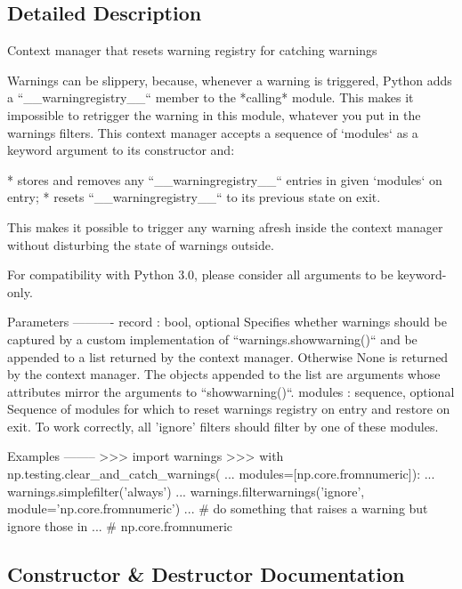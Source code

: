\subsection{Detailed Description}
\begin{DoxyVerb}Context manager that resets warning registry for catching warnings

Warnings can be slippery, because, whenever a warning is triggered, Python
adds a ``__warningregistry__`` member to the *calling* module.  This makes
it impossible to retrigger the warning in this module, whatever you put in
the warnings filters.  This context manager accepts a sequence of `modules`
as a keyword argument to its constructor and:

* stores and removes any ``__warningregistry__`` entries in given `modules`
  on entry;
* resets ``__warningregistry__`` to its previous state on exit.

This makes it possible to trigger any warning afresh inside the context
manager without disturbing the state of warnings outside.

For compatibility with Python 3.0, please consider all arguments to be
keyword-only.

Parameters
----------
record : bool, optional
    Specifies whether warnings should be captured by a custom
    implementation of ``warnings.showwarning()`` and be appended to a list
    returned by the context manager. Otherwise None is returned by the
    context manager. The objects appended to the list are arguments whose
    attributes mirror the arguments to ``showwarning()``.
modules : sequence, optional
    Sequence of modules for which to reset warnings registry on entry and
    restore on exit. To work correctly, all 'ignore' filters should
    filter by one of these modules.

Examples
--------
>>> import warnings
>>> with np.testing.clear_and_catch_warnings(
...         modules=[np.core.fromnumeric]):
...     warnings.simplefilter('always')
...     warnings.filterwarnings('ignore', module='np.core.fromnumeric')
...     # do something that raises a warning but ignore those in
...     # np.core.fromnumeric
\end{DoxyVerb}
 

\subsection{Constructor \& Destructor Documentation}
\mbox{\label{classnumpy_1_1testing_1_1__private_1_1utils_1_1clear__and__catch__warnings_afebf5316b2edd866b61e921f6f5b5cb5}} 
